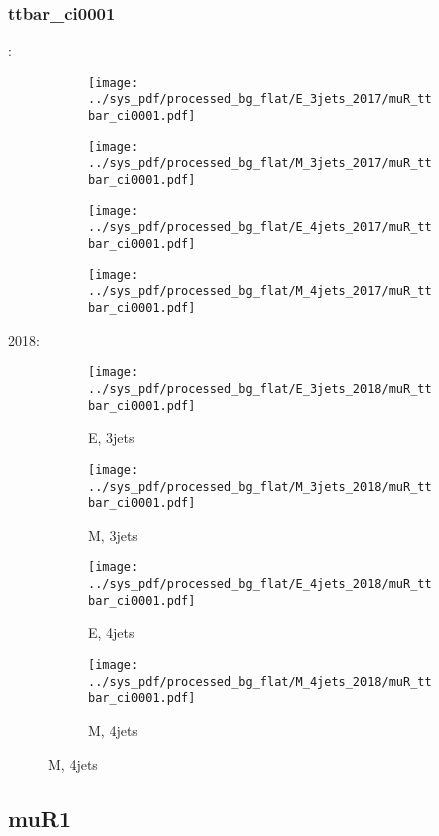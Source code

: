\documentclass{beamer}
\begin{document}
\begin{frame}
\frametitle{ttbar_ci0001}
\fontsize{5}{1}:
\begin{figure}
\centering
\begin{subfigure}[b]{0.24\textwidth}
\texttt{[image: ../sys\_pdf/processed\_bg\_flat/E\_3jets\_2017/muR\_ttbar\_ci0001.pdf]}
\end{subfigure}
\begin{subfigure}[b]{0.24\textwidth}
\texttt{[image: ../sys\_pdf/processed\_bg\_flat/M\_3jets\_2017/muR\_ttbar\_ci0001.pdf]}
\end{subfigure}
\begin{subfigure}[b]{0.24\textwidth}
\texttt{[image: ../sys\_pdf/processed\_bg\_flat/E\_4jets\_2017/muR\_ttbar\_ci0001.pdf]}
\end{subfigure}
\begin{subfigure}[b]{0.24\textwidth}
\texttt{[image: ../sys\_pdf/processed\_bg\_flat/M\_4jets\_2017/muR\_ttbar\_ci0001.pdf]}
\end{subfigure}
\end{figure}
2018:
\begin{figure}
\centering
\begin{subfigure}[b]{0.24\textwidth}
\texttt{[image: ../sys\_pdf/processed\_bg\_flat/E\_3jets\_2018/muR\_ttbar\_ci0001.pdf]}
\captionsetup{font=tiny}
\caption{E, 3jets}
\end{subfigure}
\begin{subfigure}[b]{0.24\textwidth}
\texttt{[image: ../sys\_pdf/processed\_bg\_flat/M\_3jets\_2018/muR\_ttbar\_ci0001.pdf]}
\captionsetup{font=tiny}
\caption{M, 3jets}
\end{subfigure}
\begin{subfigure}[b]{0.24\textwidth}
\texttt{[image: ../sys\_pdf/processed\_bg\_flat/E\_4jets\_2018/muR\_ttbar\_ci0001.pdf]}
\captionsetup{font=tiny}
\caption{E, 4jets}
\end{subfigure}
\begin{subfigure}[b]{0.24\textwidth}
\texttt{[image: ../sys\_pdf/processed\_bg\_flat/M\_4jets\_2018/muR\_ttbar\_ci0001.pdf]}
\captionsetup{font=tiny}
\caption{M, 4jets}
\end{subfigure}
\end{figure}
\end{frame}


\subsection{muR1}
\end{document}

